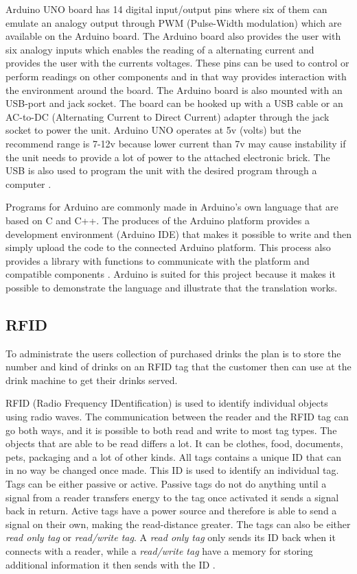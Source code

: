 Arduino UNO board has 14 digital input/output pins where six of them can emulate an analogy output through PWM (Pulse-Width modulation) which are available on the Arduino board. The Arduino board also provides the user with six analogy inputs which enables the reading of a alternating current and provides the user with the currents voltages. These pins can be used to control or perform readings on other components and in that way provides interaction with the environment around the board.
The Arduino board is also mounted with an USB-port and jack socket. The board can be hooked up with a USB cable or an AC-to-DC (Alternating Current to Direct Current) adapter through the jack socket to power the unit. Arduino UNO operates at 5v (volts) but the recommend range is 7-12v because lower current than 7v may cause instability if the unit needs to provide a lot of power to the attached electronic brick. The USB is also used to program the unit with the desired program through a computer \citep{ArduinoUno}.

Programs for Arduino are commonly made in Arduino's own language that are based on C and C++. The produces of the Arduino platform provides a development environment (Arduino IDE) that makes it possible to write and then simply upload the code to the connected Arduino platform. This process also provides a library with functions to communicate with the platform and compatible components \citep{ArduinoLanguage}.
Arduino is suited for this project because it makes it possible to demonstrate the language and illustrate that the translation works.
\label{sec:hardwarearduino}

\subsection{RFID}
To administrate the users collection of purchased drinks the plan is to store the number and kind of drinks on an RFID tag that the customer then can use at the drink machine to get their drinks served.

RFID (Radio Frequency IDentification) is used to identify individual objects using radio waves.
The communication between the reader and the RFID tag can go both ways, and it is possible to both read and write to most tag types. 
The objects that are able to be read differs a lot. It can be clothes, food, documents, pets, packaging and a lot of other kinds. 
All tags contains a unique ID that can in no way be changed once made. This ID is used to identify an individual tag.
Tags can be either passive or active. Passive tags do not do anything until a signal from a reader transfers energy to the tag once activated it sends a signal back in return. Active tags have a power source and therefore is able to send a signal on their own, making the read-distance greater.
The tags can also be either \textit{read only tag} or \textit{read/write tag}. A \textit{read only tag} only sends its ID back when it connects with a reader, while a \textit{read/write tag} have a memory for storing additional information it then sends with the ID \citep{RFID}.

